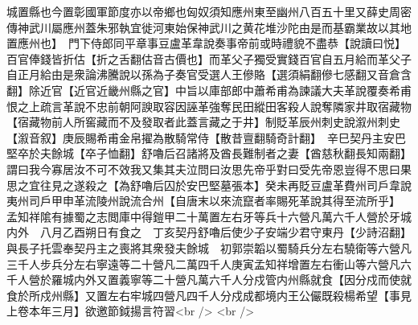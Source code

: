 城置縣也今置彰國軍節度亦以帝鄉也匈奴須知應州東至幽州八百五十里又薛史周密傳神武川屬應州蓋朱邪執宜徙河東始保神武川之黄花堆沙陀由是而基霸業故以其地置應州也】　門下侍郎同平章事豆盧革韋說奏事帝前或時禮貌不盡恭【說讀曰悦】百官俸錢皆折估【折之舌翻估音古價也】而革父子獨受實錢百官自五月給而革父子自正月給由是衆論沸騰說以孫為子奏官受選人王傪賂【選須絹翻傪七感翻又音倉含翻】除近官【近官近畿州縣之官】中旨以庫部郎中蕭希甫為諫議大夫革說覆奏希甫恨之上疏言革說不忠前朝阿諛取容因誣革強奪民田縱田客殺人說奪隣家井取宿藏物【宿藏物前人所窖藏而不及發取者此蓋言藏之于井】制貶革辰州刺史說溆州刺史【溆音叙】庚辰賜希甫金帛擢為散騎常侍【散昔亶翻騎奇計翻】　辛巳契丹主安巴堅卒於夫餘城【卒子恤翻】舒嚕后召諸將及酋長難制者之妻【酋慈秋翻長知兩翻】謂曰我今寡居汝不可不效我又集其夫泣問曰汝思先帝乎對曰受先帝恩豈得不思曰果思之宜往見之遂殺之【為舒嚕后囚於安巴堅墓張本】癸未再貶豆盧革費州司戶韋說夷州司戶甲申革流陵州說流合州【自唐末以來流竄者率賜死革說其得至流所乎】　孟知祥隂有據蜀之志閲庫中得鎧甲二十萬置左右牙等兵十六營凡萬六千人營於牙城内外　八月乙酉朔日有食之　丁亥契丹舒嚕后使少子安端少君守東丹【少詩沼翻】與長子托雲奉契丹主之喪將其衆發夫餘城　初郭崇韜以蜀騎兵分左右驍衛等六營凡三千人步兵分左右寧遠等二十營凡二萬四千人庚寅孟知祥增置左右衝山等六營凡六千人營於羅城内外又置義寧等二十營凡萬六千人分戍管内州縣就食【因分戍而使就食於所戍州縣】又置左右牢城四營凡四千人分戍成都境内王公儼既殺楊希望【事見上卷本年三月】欲邀節鉞揚言符習<br />
<br />
